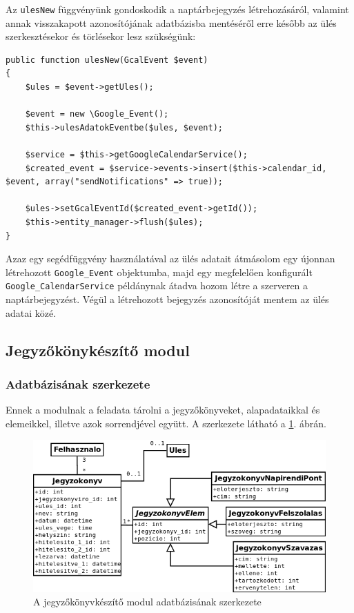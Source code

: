 \documentclass[a4paper,12pt,oneside]{report}
\begin{document}
Az {\tt ulesNew} függvényünk gondoskodik a naptárbejegyzés létrehozásáról, valamint annak visszakapott azonosítójának adatbázisba mentéséről \textendash{} erre később az ülés szerkesztésekor és törlésekor lesz szükségünk:

\begin{lstlisting}
public function ulesNew(GcalEvent $event)
{
    $ules = $event->getUles();

    $event = new \Google_Event();
    $this->ulesAdatokEventbe($ules, $event);

    $service = $this->getGoogleCalendarService();
    $created_event = $service->events->insert($this->calendar_id, $event, array("sendNotifications" => true));

    $ules->setGcalEventId($created_event->getId());
    $this->entity_manager->flush($ules);
}
\end{lstlisting}

Azaz egy segédfüggvény használatával az ülés adatait átmásolom egy újonnan létrehozott {\tt Google\_Event} objektumba, majd egy megfelelően konfigurált {\tt Google\_CalendarService} példánynak átadva hozom létre a szerveren a naptárbejegyzést. Végül a létrehozott bejegyzés azonosítóját mentem az ülés adatai közé.

\subsection{Jegyzőkönykészítő modul}

\subsubsection*{Adatbázisának szerkezete}

Ennek a modulnak a feladata tárolni a jegyzőkönyveket, alapadataikkal és elemeikkel, illetve azok sorrendjével együtt. A szerkezete látható a \ref{fig:jegyzokonyv_db}. ábrán.

\begin{figure}[h]
    \includegraphics[width=\textwidth]{jegyzokonyv_db.png}
    \caption{A jegyzőkönyvkészítő modul adatbázisának szerkezete}
    \label{fig:jegyzokonyv_db}
\end{figure}
\end{document}
